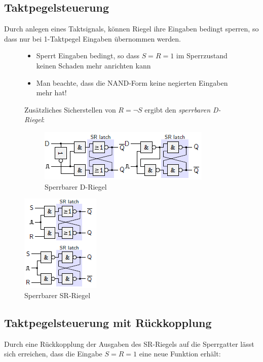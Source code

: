 \documentclass[12pt]{report}
\begin{document}
\subsection{Taktpegelsteuerung}
Durch anlegen eines Taktsignals, können Riegel ihre Eingaben bedingt sperren, so dass nur bei 1-Taktpegel Eingaben übernommen werden.
\begin{figure}[H]
  \begin{minipage}[t]{0.45\textwidth}
    \begin{itemize}
      \item Sperrt Eingaben bedingt, so dass $S=R=1$ im Sperrzustand keinen Schaden mehr anrichten kann
      \item Man beachte, dass die NAND-Form keine negierten Eingaben mehr hat!
    \end{itemize}
    
    Zusätzliches Sicherstellen von $R = \neg S$ ergibt den \textit{sperrbaren D-Riegel}:
    \begin{figure}[H]
      \caption{Sperrbarer D-Riegel}
      \centering
      \includegraphics{riegel_sperrbarer-d-riegel}
    \end{figure}
  \end{minipage}
  \hfill
  \begin{minipage}[t]{0.45\textwidth}
    \caption{Sperrbarer SR-Riegel}
    \centering
    \vspace{0px}
    \includegraphics{riegel_sperrbarer-sr-riegel}
  \end{minipage}
\end{figure}

\subsection{Taktpegelsteuerung mit Rückkopplung}
Durch eine Rückkopplung der Ausgaben des SR-Riegels auf die Sperrgatter lässt sich erreichen, 
dass die Eingabe $S=R=1$ eine neue Funktion erhält:
\end{document}
